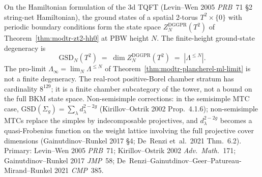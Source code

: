 \begin{remark}
\label{rem:modtr-ground-state-degeneracy}
On the Hamiltonian formulation of the 3d TQFT
(Levin--Wen 2005 \emph{PRB}~71 \S 2 string-net Hamiltonian), the ground
states of a spatial 2-torus $T^2\times\{0\}$ with periodic boundary
conditions form the state space \(Z^{\mathrm{DGGPR}}_N(T^2)\) of
Theorem~\ref{thm:modtr-zt2-hh0} at PBW height \(N\). The finite-height
ground-state degeneracy is
\[
 \mathrm{GSD}_N(T^2)
 \;=\;
 \dim Z^{\mathrm{DGGPR}}_N(T^2)
 \;=\;
 |\Lambda^{\leq N}|.
\]
The pro-limit
$\Lambda_\infty = \lim_N\Lambda^{\leq N}$ of
Theorem~\ref{thm:modtr-plancherel-ml-limit} is not a finite degeneracy.
The real-root positive-Borel chamber stratum has cardinality
\(8^{129}\); it is a finite chamber subcategory of the tower, not a
bound on the full BKM state space.
Non-semisimple corrections: in the semisimple MTC case,
$\mathrm{GSD}(\Sigma_g) = \sum_\lambda d_\lambda^{2-2g}$
(Kirillov--Ostrik 2002 Prop.~4.1.6); non-semisimple MTCs replace
the simples by indecomposable projectives, and $d_\lambda^{2-2g}$
becomes a quasi-Frobenius function on the weight lattice involving
the full projective cover dimensions
(Gainutdinov--Runkel 2017 \S 4; De~Renzi et~al.\ 2021 Thm.~6.2).
Primary: Levin--Wen 2005 \emph{PRB}~71; Kirillov--Ostrik 2002
\emph{Adv.\ Math.}~171; Gainutdinov--Runkel 2017 \emph{JMP}~58;
De~Renzi--Gainutdinov--Geer--Patureau-Mirand--Runkel 2021
\emph{CMP}~385.
\end{remark}


